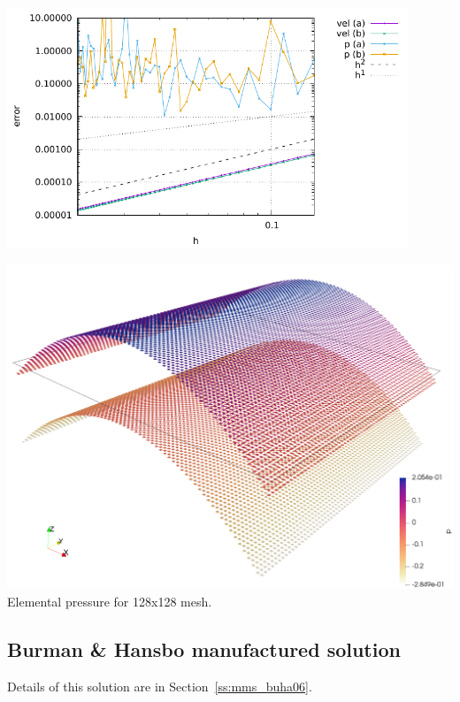 \begin{center}
\includegraphics[width=12cm]{python_codes/fieldstone_14/results/dh/errors.pdf}
\end{center}


\begin{center}
\includegraphics[width=15cm]{python_codes/fieldstone_14/results/dh/p128x128}\\
{\captionfont Elemental pressure for 128x128 mesh.}
\end{center}

\newpage
\subsection*{Burman \& Hansbo manufactured solution}

Details of this solution are in Section~\ref{ss:mms_buha06}.



